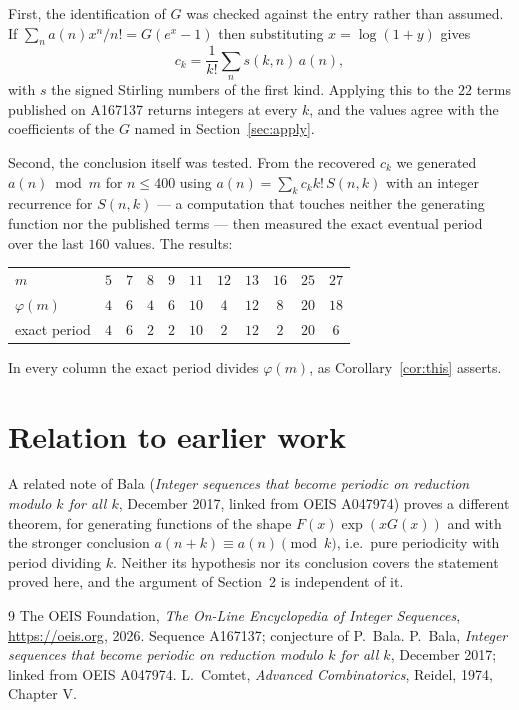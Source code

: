 \documentclass[11pt,a4paper]{article}
\theoremstyle{plain}
\theoremstyle{definition}
\begin{document}
First, the identification of $G$ was checked against the entry rather than assumed. If
$\sum_{n}a(n)x^{n}/n!=G(e^{x}-1)$ then substituting $x=\log(1+y)$ gives
\[
c_{k}=\frac{1}{k!}\sum_{n}s(k,n)\,a(n),
\]
with $s$ the signed Stirling numbers of the first kind. Applying this to the
$22$ terms published on A167137 returns integers at every $k$, and the values
agree with the coefficients of the $G$ named in Section~\ref{sec:apply}.

Second, the conclusion itself was tested. From the recovered $c_{k}$ we generated
$a(n)\bmod m$ for $n\le400$ using $a(n)=\sum_{k}c_{k}k!\,S(n,k)$ with an integer
recurrence for $S(n,k)$ --- a computation that touches neither the generating function nor
the published terms --- then measured the exact eventual period over the last $160$
values. The results:

\begin{center}
\begin{tabular}{@{}lcccccccccc@{}}
\toprule
$m$  & $5$ & $7$ & $8$ & $9$ & $11$ & $12$ & $13$ & $16$ & $25$ & $27$\\
$\varphi(m)$  & $4$ & $6$ & $4$ & $6$ & $10$ & $4$ & $12$ & $8$ & $20$ & $18$\\
exact period  & $4$ & $6$ & $2$ & $2$ & $10$ & $2$ & $12$ & $2$ & $20$ & $6$\\
\bottomrule
\end{tabular}
\end{center}

\noindent
In every column the exact period divides $\varphi(m)$, as Corollary~\ref{cor:this}
asserts.

\section{Relation to earlier work}

A related note of Bala (\emph{Integer sequences that become periodic on reduction modulo
$k$ for all $k$}, December 2017, linked from OEIS A047974) proves a different theorem, for
generating functions of the shape $F(x)\exp(xG(x))$ and with the stronger conclusion
$a(n+k)\equiv a(n)\pmod{k}$, i.e.\ pure periodicity with period dividing $k$. Neither its
hypothesis nor its conclusion covers the statement proved here, and the argument of
Section~2 is independent of it.

\begin{thebibliography}{9}
 The OEIS Foundation, \emph{The On-Line Encyclopedia of Integer Sequences},
\url{https://oeis.org}, 2026. Sequence A167137; conjecture of P.\ Bala.
 P.\ Bala, \emph{Integer sequences that become periodic on reduction modulo
$k$ for all $k$}, December 2017; linked from OEIS A047974.
 L.\ Comtet, \emph{Advanced Combinatorics}, Reidel, 1974, Chapter V.
\end{thebibliography}
\end{document}
